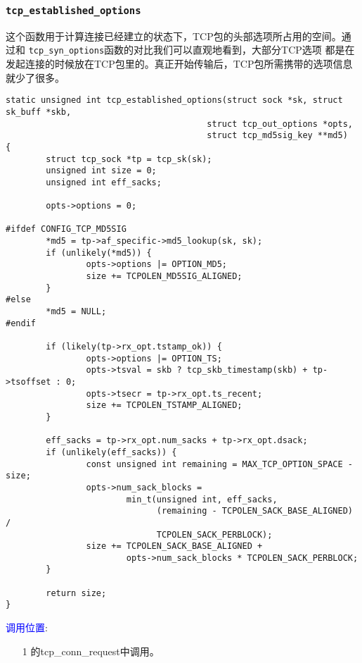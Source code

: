 		\subsubsection{\texttt{tcp_established_options}}
			这个函数用于计算连接已经建立的状态下，TCP包的头部选项所占用的空间。通过和
			\texttt{tcp_syn_options}函数的对比我们可以直观地看到，大部分TCP选项
			都是在发起连接的时候放在TCP包里的。真正开始传输后，TCP包所需携带的选项信息
			就少了很多。
\begin{verbatim}
static unsigned int tcp_established_options(struct sock *sk, struct sk_buff *skb,
                                        struct tcp_out_options *opts,
                                        struct tcp_md5sig_key **md5)
{       
        struct tcp_sock *tp = tcp_sk(sk);
        unsigned int size = 0;
        unsigned int eff_sacks;
        
        opts->options = 0;

#ifdef CONFIG_TCP_MD5SIG
        *md5 = tp->af_specific->md5_lookup(sk, sk);
        if (unlikely(*md5)) { 
                opts->options |= OPTION_MD5;
                size += TCPOLEN_MD5SIG_ALIGNED;
        }
#else   
        *md5 = NULL;
#endif
        
        if (likely(tp->rx_opt.tstamp_ok)) {
                opts->options |= OPTION_TS;
                opts->tsval = skb ? tcp_skb_timestamp(skb) + tp->tsoffset : 0;
                opts->tsecr = tp->rx_opt.ts_recent;
                size += TCPOLEN_TSTAMP_ALIGNED;
        }
        
        eff_sacks = tp->rx_opt.num_sacks + tp->rx_opt.dsack;
        if (unlikely(eff_sacks)) { 
                const unsigned int remaining = MAX_TCP_OPTION_SPACE - size;
                opts->num_sack_blocks =
                        min_t(unsigned int, eff_sacks,
                              (remaining - TCPOLEN_SACK_BASE_ALIGNED) /
                              TCPOLEN_SACK_PERBLOCK);
                size += TCPOLEN_SACK_BASE_ALIGNED +
                        opts->num_sack_blocks * TCPOLEN_SACK_PERBLOCK;
        }
        
        return size;
}
\end{verbatim}

        \textcolor{blue}{调用位置}:
            \begin{enumerate}
                \item[1]        \label{Server:tcp_conn_request}的tcp\_conn\_request中调用。
            \end{enumerate}

